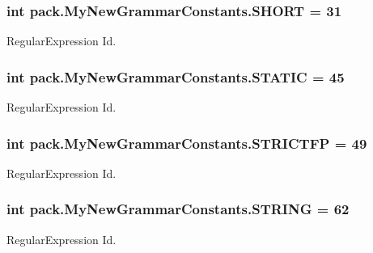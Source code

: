 \subsubsection[{\texorpdfstring{S\+H\+O\+RT}{SHORT}}]{\setlength{\rightskip}{0pt plus 5cm}int pack.\+My\+New\+Grammar\+Constants.\+S\+H\+O\+RT = 31}\hypertarget{interfacepack_1_1_my_new_grammar_constants_a84b0602a95d82f9ccc44db9b26f3fd27}{}\label{interfacepack_1_1_my_new_grammar_constants_a84b0602a95d82f9ccc44db9b26f3fd27}
Regular\+Expression Id. 
\subsubsection[{\texorpdfstring{S\+T\+A\+T\+IC}{STATIC}}]{\setlength{\rightskip}{0pt plus 5cm}int pack.\+My\+New\+Grammar\+Constants.\+S\+T\+A\+T\+IC = 45}\hypertarget{interfacepack_1_1_my_new_grammar_constants_ad202082debf785d20cd3c8334a30f252}{}\label{interfacepack_1_1_my_new_grammar_constants_ad202082debf785d20cd3c8334a30f252}
Regular\+Expression Id. 
\subsubsection[{\texorpdfstring{S\+T\+R\+I\+C\+T\+FP}{STRICTFP}}]{\setlength{\rightskip}{0pt plus 5cm}int pack.\+My\+New\+Grammar\+Constants.\+S\+T\+R\+I\+C\+T\+FP = 49}\hypertarget{interfacepack_1_1_my_new_grammar_constants_a2b3a5d129fba89235ccc7afb26ea1772}{}\label{interfacepack_1_1_my_new_grammar_constants_a2b3a5d129fba89235ccc7afb26ea1772}
Regular\+Expression Id. 
\subsubsection[{\texorpdfstring{S\+T\+R\+I\+NG}{STRING}}]{\setlength{\rightskip}{0pt plus 5cm}int pack.\+My\+New\+Grammar\+Constants.\+S\+T\+R\+I\+NG = 62}\hypertarget{interfacepack_1_1_my_new_grammar_constants_a6e127815a4851fd43f7242db9511a76f}{}\label{interfacepack_1_1_my_new_grammar_constants_a6e127815a4851fd43f7242db9511a76f}
Regular\+Expression Id. 
